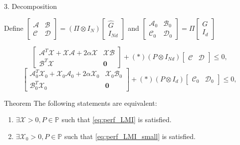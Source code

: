 \documentclass{beamer}
\begin{document}
\begin{frame}{3. Decomposition}
	\begin{block}{Define}
		$\left[\begin{array}{c|c}
			\mathcal{A}     &  \mathcal{B}\\
			\hline
			\mathcal{C}     &  \mathcal{D}
		\end{array}\right]=
		(\Pi \otimes I_N)\begin{bmatrix}
			\hat{G}\\
			I_{Nd}
		\end{bmatrix}$ and $
		\left[\begin{array}{c|c}
			\mathcal{A}_0     &  \mathcal{B}_0\\
			\hline
			\mathcal{C}_0     &  \mathcal{D}_0
		\end{array}\right]=
		\Pi\begin{bmatrix}
			G\\
			I_{d}
		\end{bmatrix}$
	\end{block}
		\pause 
		\begin{equation}\label{eq:perf_LMI}
				\begin{bmatrix}
					\mathcal{A}^T\mathcal{X}+\mathcal{X}\mathcal{A}+2\alpha \mathcal{X}  & \mathcal{X}\mathcal{B} \\
					\mathcal{B}^T\mathcal{X}    & \mathbf{0}
				\end{bmatrix}
				+
				(*)
				( P\otimes I_{Nd})
				\begin{bmatrix}
					\mathcal{C} & \mathcal{D} 
				\end{bmatrix}
				\leq 
				0,
			\end{equation}	
		\begin{equation}\label{eq:perf_LMI_small}
			\begin{bmatrix}
				\mathcal{A}_0^T\mathcal{X}_0+\mathcal{X}_0\mathcal{A}_0+2\alpha \mathcal{X}_0  & \mathcal{X}_0\mathcal{B}_0 \\
				\mathcal{B}_0^T\mathcal{X}_0    & \mathbf{0}
			\end{bmatrix}
			+
			(*)
			( P\otimes I_{d})
			\begin{bmatrix}
				\mathcal{C}_0 & \mathcal{D}_0 
			\end{bmatrix}
			\leq 
			0,
		\end{equation}
	\pause 
	\begin{block}{Theorem}
	The following statements are equivalent:
	\begin{enumerate}
		\item $\exists \mathcal{X}>0,P \in \mathbb{P}$ such that \eqref{eq:perf_LMI} is satisfied.
		\item $\exists \mathcal{X}_0>0,P \in \mathbb{P}$ such that \eqref{eq:perf_LMI_small} is satisfied.
	\end{enumerate}	
	\end{block}
\end{frame}
\end{document}
